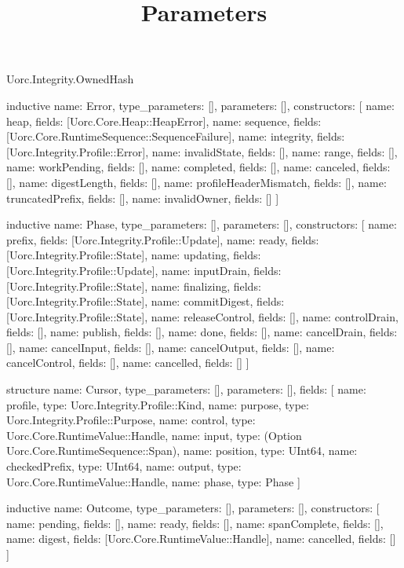 \begin{lexlean}{Uorc.Integrity.OwnedHash}
\title{Parameters}
\begin{semanticmodule}
inductive{
  name: Error,
  type_parameters: [],
  parameters: [],
  constructors: [
    {name: heap, fields: [Uorc.Core.Heap::HeapError]},
    {name: sequence, fields: [Uorc.Core.RuntimeSequence::SequenceFailure]},
    {name: integrity, fields: [Uorc.Integrity.Profile::Error]},
    {name: invalidState, fields: []},
    {name: range, fields: []},
    {name: workPending, fields: []},
    {name: completed, fields: []},
    {name: canceled, fields: []},
    {name: digestLength, fields: []},
    {name: profileHeaderMismatch, fields: []},
    {name: truncatedPrefix, fields: []},
    {name: invalidOwner, fields: []}
  ]
}

inductive{
  name: Phase,
  type_parameters: [],
  parameters: [],
  constructors: [
    {name: prefix, fields: [Uorc.Integrity.Profile::Update]},
    {name: ready, fields: [Uorc.Integrity.Profile::State]},
    {name: updating, fields: [Uorc.Integrity.Profile::Update]},
    {name: inputDrain, fields: [Uorc.Integrity.Profile::State]},
    {name: finalizing, fields: [Uorc.Integrity.Profile::State]},
    {name: commitDigest, fields: [Uorc.Integrity.Profile::State]},
    {name: releaseControl, fields: []},
    {name: controlDrain, fields: []},
    {name: publish, fields: []},
    {name: done, fields: []},
    {name: cancelDrain, fields: []},
    {name: cancelInput, fields: []},
    {name: cancelOutput, fields: []},
    {name: cancelControl, fields: []},
    {name: cancelled, fields: []}
  ]
}

structure{
  name: Cursor,
  type_parameters: [],
  parameters: [],
  fields: [
    {name: profile, type: Uorc.Integrity.Profile::Kind},
    {name: purpose, type: Uorc.Integrity.Profile::Purpose},
    {name: control, type: Uorc.Core.RuntimeValue::Handle},
    {name: input, type: (Option Uorc.Core.RuntimeSequence::Span)},
    {name: position, type: UInt64},
    {name: checkedPrefix, type: UInt64},
    {name: output, type: Uorc.Core.RuntimeValue::Handle},
    {name: phase, type: Phase}
  ]
}

inductive{
  name: Outcome,
  type_parameters: [],
  parameters: [],
  constructors: [
    {name: pending, fields: []},
    {name: ready, fields: []},
    {name: spanComplete, fields: []},
    {name: digest, fields: [Uorc.Core.RuntimeValue::Handle]},
    {name: cancelled, fields: []}
  ]
}


\end{semanticmodule}
\end{lexlean}
